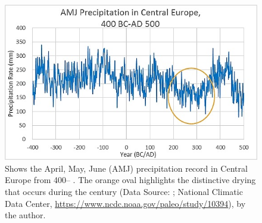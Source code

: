 	
	
	\begin{figure}[!p]
		\includegraphics[width=\linewidth]{figures/Davis_Agroeconomy_Fig10.jpg}
		\centering
		\caption{Shows the April, May, June (AMJ) precipitation record in Central Europe from 400\BC – . The orange oval highlights the distinctive drying that occurs during the  century \AD (Data Source: \textcite{Büntgen_2011b}; National Climatic Data Center, \url{https://www.ncdc.noaa.gov/paleo/study/10394}), by the author.}
		\label{fig:DavisFig10}
	\end{figure}
	
	
	
